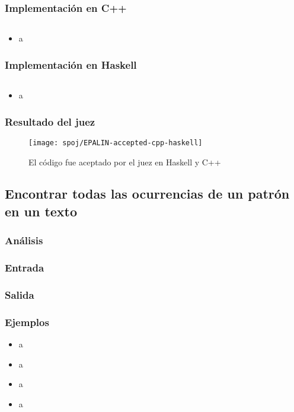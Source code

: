 

\subsubsection{Implementación en C++}
\inputminted[linenos, frame=lines]{cpp}{problemas/cpp/EPALIN.cpp}

\begin{itemize}
\item a
\end{itemize}

\subsubsection{Implementación en Haskell}
\inputminted[linenos, frame=lines]{haskell}{problemas/haskell/EPALIN.hs}

\begin{itemize}
\item a
\end{itemize}

\subsubsection{Resultado del juez}
\begin{figure}[h]
\centering
\texttt{[image: spoj/EPALIN-accepted-cpp-haskell]}
\caption{El código fue aceptado por el juez en Haskell y C++}
\end{figure}

\newpage


\subsection{Encontrar todas las ocurrencias de un patrón en un texto}

\subsubsection{Análisis}

\subsubsection{Entrada}

\subsubsection{Salida}

\subsubsection{Ejemplos}
\begin{itemize}
\item a
\item a
\item a
\item a
\end{itemize}

